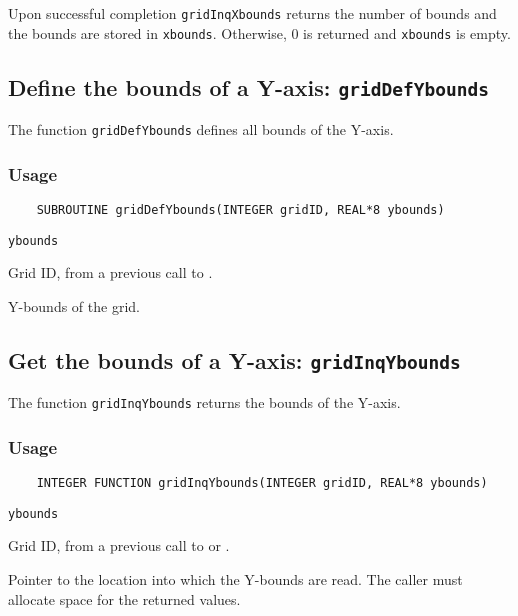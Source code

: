 Upon successful completion {\tt gridInqXbounds} returns the number of bounds and
the bounds are stored in {\tt xbounds}.
Otherwise, 0 is returned and {\tt xbounds} is empty.



\subsection{Define the bounds of a Y-axis: {\tt gridDefYbounds}}
\label{gridDefYbounds}

The function {\tt gridDefYbounds} defines all bounds of the Y-axis.

\subsubsection*{Usage}

\begin{verbatim}
    SUBROUTINE gridDefYbounds(INTEGER gridID, REAL*8 ybounds)
\end{verbatim}

\hspace*{4mm}\begin{minipage}[]{15cm}
\begin{deflist}{\tt ybounds\ }
\item[{\tt gridID}]
Grid ID, from a previous call to {}.
\item[{\tt ybounds}]
Y-bounds of the grid.

\end{deflist}
\end{minipage}


\subsection{Get the bounds of a Y-axis: {\tt gridInqYbounds}}
\label{gridInqYbounds}

The function {\tt gridInqYbounds} returns the bounds of the Y-axis.

\subsubsection*{Usage}

\begin{verbatim}
    INTEGER FUNCTION gridInqYbounds(INTEGER gridID, REAL*8 ybounds)
\end{verbatim}

\hspace*{4mm}\begin{minipage}[]{15cm}
\begin{deflist}{\tt ybounds\ }
\item[{\tt gridID}]
Grid ID, from a previous call to {} or {}.
\item[{\tt ybounds}]
Pointer to the location into which the Y-bounds are read.
                    The caller must allocate space for the returned values.

\end{deflist}
\end{minipage}

